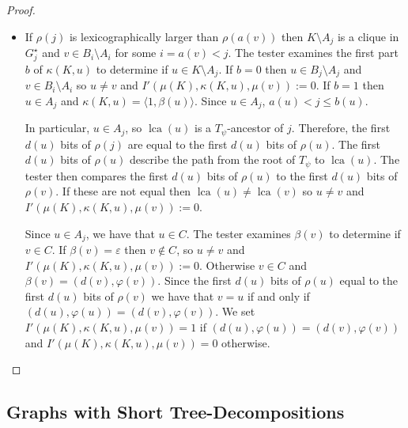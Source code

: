 \documentclass{patmorin}
\renewcommand{\le}{\leqslant}
\newcommand{\pat}[1]{\noindent\textcolor{Magenta}{PaMo: #1}}
\newcommand{\piotr}[1]{\noindent\textcolor{red}{PiMi: #1}}
\DeclareMathOperator{\lca}{lca}
\begin{document}
\begin{proof}
\begin{itemize}
       \item If $\rho(j)$ is lexicographically larger than $\rho(a(v))$ then $K\setminus A_j$ is a clique in $G^\star_j$ and $v\in B_i\setminus A_i$ for some $i=a(v) < j$.  The tester examines the first part $b$ of $\kappa(K,u)$ to determine if $u\in K\setminus A_j$.  If $b=0$ then  $u\in B_j\setminus A_j$ and $v\in B_i\setminus A_i$ so $u\neq v$ and $I'(\mu(K),\kappa(K,u),\mu(v)):=0$.  If $b=1$ then $u\in A_j$ and $\kappa(K,u)=\langle 1,\beta(u)\rangle$. Since $u\in A_j$, $a(u) < j\le b(u)$.

       
       
       In particular, $u\in A_j$, so $\lca(u)$ is a $T_\psi$-ancestor of $j$.   Therefore, the first $d(u)$ bits of $\rho(j)$ are equal to the first $d(u)$ bits of $\rho(u)$.  The first $d(u)$ bits of $\rho(u)$ describe the path from the root of $T_\psi$ to $\lca(u)$.  The tester then compares the first $d(u)$ bits of $\rho(u)$ to the first $d(u)$ bits of $\rho(v)$.  If these are not equal then $\lca(u)\neq\lca(v)$ so $u\neq v$ and $I'(\mu(K),\kappa(K,u),\mu(v)):=0$.

       Since $u\in A_j$, we have that $u\in C$.  The tester examines $\beta(v)$ to determine if $v\in C$.  If $\beta(v)=\varepsilon$ then $v\not\in C$, so $u\neq v$ and $I'(\mu(K),\kappa(K,u),\mu(v)):=0$. Otherwise $v\in C$ and $\beta(v)=(d(v),\varphi(v))$. Since the first $d(u)$ bits of $\rho(u)$ equal to the first $d(u)$ bits of $\rho(v)$ we have that $v=u$ if and only if $(d(u),\varphi(u))=(d(v),\varphi(v))$.  
       We set $I'(\mu(K),\kappa(K,u),\mu(v))=1$ if $(d(u),\varphi(u))=(d(v),\varphi(v))$ and $I'(\mu(K),\kappa(K,u),\mu(v))=0$ otherwise.
     \end{itemize}
  \end{proof}



\subsection{Graphs with Short Tree-Decompositions}

\end{document}
